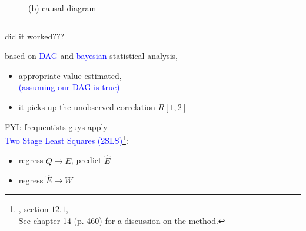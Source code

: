 \begin{frame}
\begin{columns}
\begin{column}{0.5\textwidth}
\begin{figure}
				\caption*{(b) causal diagram}
			\end{figure}
		\end{column}
	\end{columns}
\end{frame}
%
%
\begin{lhframe}[rhgraphic={\texttt{[image: fork5\_reg3.png]}}]
	{did it worked???}
	
	based on \textcolor{blue}{DAG} and \textcolor{blue}{bayesian} statistical analysis,
	\begin{itemize}
		\item appropriate value estimated, \\
		{\small \textcolor{blue}{(assuming our DAG is true)} }
		\item it picks up the unobserved correlation $R[1,2]$
	\end{itemize}
	
	\alert{FYI:} frequentists guys apply \\
	\textcolor{blue}{Two Stage Least Squares (2SLS)}\footnote{\citet{Hanck_et_al_2021}, section $12.1$, \\
		See \citet{McElreath_2020} chapter 14 (p. 460) for a discussion on the method.}:
	\begin{itemize}
		\item regress $Q \rightarrow E$, predict $\hat{E}$
		\item regress $\hat{E} \rightarrow W$
	\end{itemize}
\end{lhframe}
%
%
%
%
